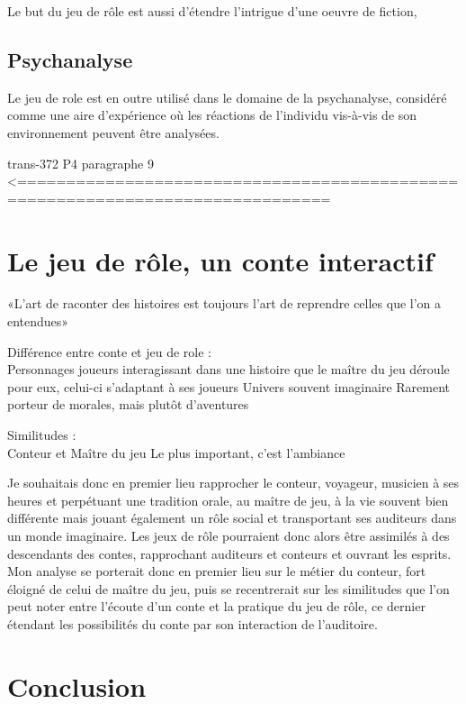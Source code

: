\documentclass[a4paper,12pt,final,oneside]{article}
\begin{document}
Le but du jeu de rôle est aussi d'étendre l'intrigue d'une oeuvre de fiction, 

\subsection{Psychanalyse}
Le jeu de role est en outre utilisé dans le domaine de la psychanalyse, considéré comme une aire d'expérience où les réactions de l'individu vis-à-vis de son environnement peuvent être analysées. 


trans-372 P4 paragraphe 9 <==============================================================================




\section{Le jeu de rôle, un conte interactif}
«L'art de raconter des histoires est toujours l'art de reprendre celles que l'on a entendues»

Différence entre conte et jeu de role : \\
Personnages joueurs interagissant dans une histoire que le maître du jeu déroule pour eux, celui-ci s'adaptant à ses joueurs
Univers souvent imaginaire
Rarement porteur de morales, mais plutôt d'aventures

Similitudes :\\
Conteur et Maître du jeu
Le plus important, c'est l'ambiance


Je souhaitais donc en premier lieu rapprocher le conteur, voyageur, musicien à ses heures et perpétuant une tradition orale, au maître de jeu, à la vie souvent bien différente mais jouant également un rôle social et transportant ses auditeurs dans un monde imaginaire.
Les jeux de rôle pourraient donc alors être assimilés à des descendants des contes, rapprochant auditeurs et conteurs et ouvrant les esprits.\\

Mon analyse se porterait donc en premier lieu sur le métier du conteur, fort éloigné de celui de maître du jeu, puis se recentrerait sur les similitudes que l'on peut noter entre l'écoute d'un conte et la pratique du jeu de rôle, ce dernier étendant les possibilités du conte par son interaction de l'auditoire.

\clearpage


\section{Conclusion}
\clearpage
\end{document}
